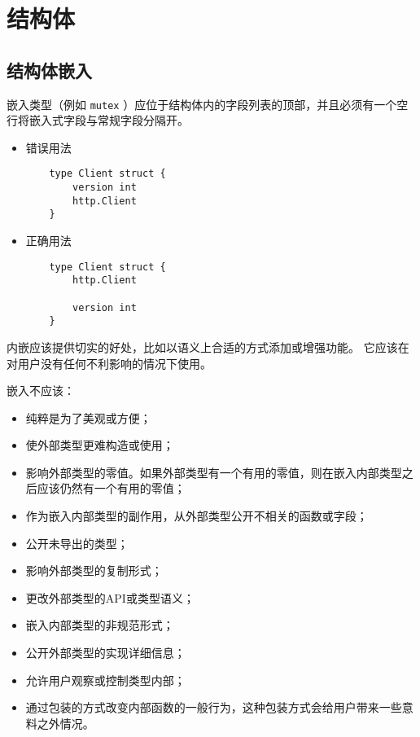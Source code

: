 \chapter{结构体}
\section{结构体嵌入}
嵌入类型（例如 \texttt{mutex} ）应位于结构体内的字段列表的顶部，并且必须有一个空行将嵌入式字段与常规字段分隔开。
\begin{itemize}[leftmargin=4em]
\item 错误用法

  \begin{verbatim}
    type Client struct {
    	version int
    	http.Client
    }
  \end{verbatim}
\item 正确用法

  \begin{verbatim}
    type Client struct {
    	http.Client

    	version int
    }
  \end{verbatim}
\end{itemize}

内嵌应该提供切实的好处，比如以语义上合适的方式添加或增强功能。 它应该在对用户没有任何不利影响的情况下使用。

嵌入不应该：
\begin{itemize}[leftmargin=4em]
\item 纯粹是为了美观或方便；
\item 使外部类型更难构造或使用；
\item 影响外部类型的零值。如果外部类型有一个有用的零值，则在嵌入内部类型之后应该仍然有一个有用的零值；
\item 作为嵌入内部类型的副作用，从外部类型公开不相关的函数或字段；
\item 公开未导出的类型；
\item 影响外部类型的复制形式；
\item 更改外部类型的API或类型语义；
\item 嵌入内部类型的非规范形式；
\item 公开外部类型的实现详细信息；
\item 允许用户观察或控制类型内部；
\item 通过包装的方式改变内部函数的一般行为，这种包装方式会给用户带来一些意料之外情况。
\end{itemize}

